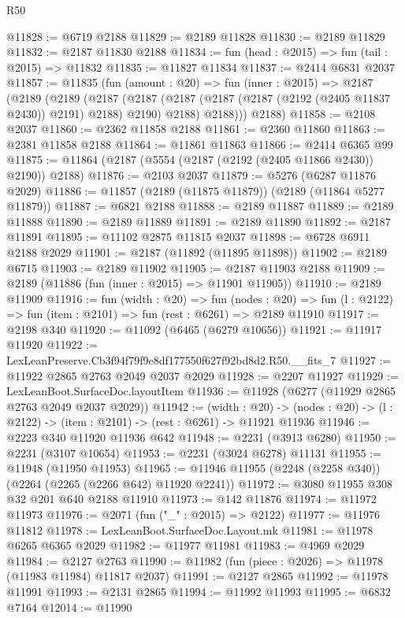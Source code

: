 \begin{lexlean}{R50}
\begin{coremodule}
@11828 := @6719 @2188
@11829 := @2189 @11828
@11830 := @2189 @11829
@11832 := @2187 @11830 @2188
@11834 := fun (head : @2015) => fun (tail : @2015) => @11832
@11835 := @11827 @11834
@11837 := @2414 @6831 @2037
@11857 := @11835
    (fun (amount : @20) =>
    fun (inner : @2015) =>
    @2187
      (@2189
        (@2189
          (@2187
            (@2187 (@2187 (@2187 (@2187 (@2192 (@2405 @11837 @2430)) @2191) @2188) @2190) @2188)
            @2188)))
      @2188)
@11858 := @2108 @2037
@11860 := @2362 @11858 @2188
@11861 := @2360 @11860
@11863 := @2381 @11858 @2188
@11864 := @11861 @11863
@11866 := @2414 @6365 @99
@11875 := @11864 (@2187 (@5554 (@2187 (@2192 (@2405 @11866 @2430)) @2190)) @2188)
@11876 := @2103 @2037
@11879 := @5276 (@6287 @11876 @2029)
@11886 := @11857 (@2189 (@11875 @11879)) (@2189 (@11864 @5277 @11879))
@11887 := @6821 @2188
@11888 := @2189 @11887
@11889 := @2189 @11888
@11890 := @2189 @11889
@11891 := @2189 @11890
@11892 := @2187 @11891
@11895 := @11102 @2875 @11815 @2037
@11898 := @6728 @6911 @2188 @2029
@11901 := @2187 (@11892 (@11895 @11898))
@11902 := @2189 @6715
@11903 := @2189 @11902
@11905 := @2187 @11903 @2188
@11909 := @2189 (@11886 (fun (inner : @2015) => @11901 @11905))
@11910 := @2189 @11909
@11916 := fun (width : @20) =>
  fun (nodes : @20) => fun (l : @2122) => fun (item : @2101) => fun (rest : @6261) => @2189 @11910
@11917 := @2198 @340
@11920 := @11092 (@6465 (@6279 @10656))
@11921 := @11917 @11920
@11922 := LexLeanPreserve.Cb3f94f79f9e8df177550f627f92bd8d2.R50.__fits_7
@11927 := @11922 @2865 @2763 @2049 @2037 @2029
@11928 := @2207 @11927
@11929 := LexLeanBoot.SurfaceDoc.layoutItem
@11936 := @11928 (@6277 (@11929 @2865 @2763 @2049 @2037 @2029))
@11942 := (width : @20) ->
  (nodes : @20) -> (l : @2122) -> (item : @2101) -> (rest : @6261) -> @11921 @11936
@11946 := @2223 @340 @11920 @11936 @642
@11948 := @2231 (@3913 @6280)
@11950 := @2231 (@3107 @10654)
@11953 := @2231 (@3024 @6278) @11131
@11955 := @11948 (@11950 @11953)
@11965 := @11946 @11955 (@2248 (@2258 @340)) (@2264 (@2265 (@2266 @642) @11920 @2241))
@11972 := @3080 @11955 @308 @32 @201 @640 @2188 @11910
@11973 := @142 @11876
@11974 := @11972 @11973
@11976 := @2071 (fun ("_" : @2015) => @2122)
@11977 := @11976 @11812
@11978 := LexLeanBoot.SurfaceDoc.Layout.mk
@11981 := @11978 @6265 @6365 @2029
@11982 := @11977 @11981
@11983 := @4969 @2029
@11984 := @2127 @2763
@11990 := @11982 (fun (piece : @2026) => @11978 (@11983 @11984) @11817 @2037)
@11991 := @2127 @2865
@11992 := @11978 @11991
@11993 := @2131 @2865
@11994 := @11992 @11993
@11995 := @6832 @7164
@12014 := @11990

\end{coremodule}
\end{lexlean}
